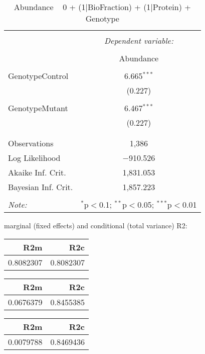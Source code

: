 \documentclass[11pt]{report}
\begin{document}
\begin{table}[!htbp] \centering 
  \caption{Abundance ~ 0 + (1|BioFraction) + (1|Protein) + Genotype} 
  \label{} 
\begin{tabular}{@{\extracolsep{5pt}}lc} 
\\[-1.8ex]\hline 
\hline \\[-1.8ex] 
 & \multicolumn{1}{c}{\textit{Dependent variable:}} \\ 
\cline{2-2} 
\\[-1.8ex] & Abundance \\ 
\hline \\[-1.8ex] 
 GenotypeControl & 6.665$^{***}$ \\ 
  & (0.227) \\ 
  & \\ 
 GenotypeMutant & 6.467$^{***}$ \\ 
  & (0.227) \\ 
  & \\ 
\hline \\[-1.8ex] 
Observations & 1,386 \\ 
Log Likelihood & $-$910.526 \\ 
Akaike Inf. Crit. & 1,831.053 \\ 
Bayesian Inf. Crit. & 1,857.223 \\ 
\hline 
\hline \\[-1.8ex] 
\textit{Note:}  & \multicolumn{1}{r}{$^{*}$p$<$0.1; $^{**}$p$<$0.05; $^{***}$p$<$0.01} \\ 
\end{tabular} 
\end{table} 
marginal (fixed effects) and conditional (total variance) R2:

\begin{tabular}{r|r}
\hline
R2m & R2c\\
\hline
0.8082307 & 0.8082307\\
\hline
\end{tabular}

\begin{tabular}{r|r}
\hline
R2m & R2c\\
\hline
0.0676379 & 0.8455385\\
\hline
\end{tabular}

\begin{tabular}{r|r}
\hline
R2m & R2c\\
\hline
0.0079788 & 0.8469436\\
\hline
\end{tabular}
\end{document}
